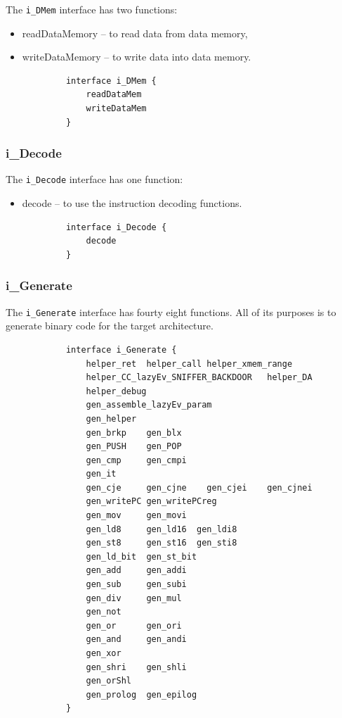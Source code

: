 \documentclass{report}
\begin{document}
			\par The \texttt{i\_DMem} interface has two functions:
			\begin{itemize}
				\item readDataMemory -- to read data from data memory,
				\item writeDataMemory -- to write data into data memory.
			\end{itemize}
			
			\begin{lstlisting}
			interface i_DMem {
				readDataMem	 	
				writeDataMem
			}
			\end{lstlisting}			
			
			\subsubsection*{i\_Decode}
			
			\par The \texttt{i\_Decode} interface has one function:
			\begin{itemize}
				\item decode -- to use the instruction decoding functions.
			\end{itemize}
			
			\begin{lstlisting}
			interface i_Decode {
				decode 
			}
			\end{lstlisting}	
					
			\subsubsection*{i\_Generate}
			
			\par The \texttt{i\_Generate} interface has fourty eight functions. All of its purposes is to generate binary code for the target architecture.
			
			\begin{lstlisting}
			interface i_Generate {
				helper_ret	helper_call	helper_xmem_range	
				helper_CC_lazyEv_SNIFFER_BACKDOOR	helper_DA	
				helper_debug
				gen_assemble_lazyEv_param
				gen_helper	
				gen_brkp  	gen_blx
				gen_PUSH  	gen_POP
				gen_cmp 	gen_cmpi
				gen_it  
				gen_cje  	gen_cjne	gen_cjei  	gen_cjnei
				gen_writePC gen_writePCreg
				gen_mov  	gen_movi
				gen_ld8  	gen_ld16  gen_ldi8
				gen_st8	 	gen_st16  gen_sti8
				gen_ld_bit  gen_st_bit
				gen_add  	gen_addi
				gen_sub  	gen_subi
				gen_div  	gen_mul
				gen_not
				gen_or  	gen_ori
				gen_and  	gen_andi
				gen_xor
				gen_shri 	gen_shli
				gen_orShl
				gen_prolog  gen_epilog
			}
			\end{lstlisting}
			
\end{document}
